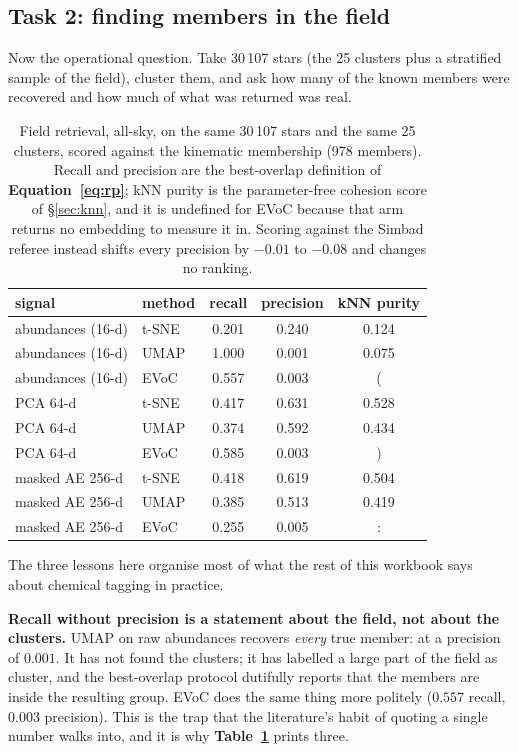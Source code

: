 \subsection{Task 2: finding members in the field}

Now the operational question. Take 30\,107 stars (the 25 clusters plus a
stratified sample of the field), cluster them, and ask how many of the known
members were recovered and how much of what was returned was real.

\begin{table}[htbp]
\centering
\small
{}
\begin{tabular}{@{}llccc@{}} \toprule signal & method & recall & precision &
kNN purity \\ \midrule abundances (16-d) & t-SNE & 0.201 & 0.240 & 0.124 \\
abundances (16-d) & UMAP & 1.000 & 0.001 & 0.075 \\ abundances (16-d) & EVoC &
0.557 & 0.003 & (\\ \midrule PCA 64-d & t-SNE & 0.417 & 0.631 & 0.528 \\ PCA
64-d & UMAP & 0.374 & 0.592 & 0.434 \\ PCA 64-d & EVoC & 0.585 & 0.003 &) \\
\midrule masked AE 256-d & t-SNE & 0.418 & 0.619 & 0.504 \\ masked AE 256-d &
UMAP & 0.385 & 0.513 & 0.419 \\ masked AE 256-d & EVoC & 0.255 & 0.005 &: \\
\bottomrule
\end{tabular}
\caption{Field retrieval, all-sky, on the same 30\,107 stars and the same 25
clusters, scored against the kinematic membership (978 members). Recall and
precision are the best-overlap definition of \textbf{Equation~\ref{eq:rp}};
kNN purity is the parameter-free cohesion score of \S\ref{sec:knn}, and it is
undefined for EVoC because that arm returns no embedding to measure it in.
Scoring against the Simbad referee instead shifts every precision by
$-0.01$ to $-0.08$ and changes no ranking.}
\label{tab:field}
\end{table}

The three lessons here organise most of what the rest of this workbook says
about chemical tagging in practice.

\textbf{Recall without precision is a statement about the field, not about the
clusters.} UMAP on raw abundances recovers \emph{every} true member: at a
precision of $0.001$. It has not found the clusters; it has labelled a large
part of the field as cluster, and the best-overlap protocol dutifully reports
that the members are inside the resulting group. EVoC does the same thing more
politely ($0.557$ recall, $0.003$ precision). This is the trap that the
literature's habit of quoting a single number walks into, and it is why
\textbf{Table~\ref{tab:field}} prints three.


